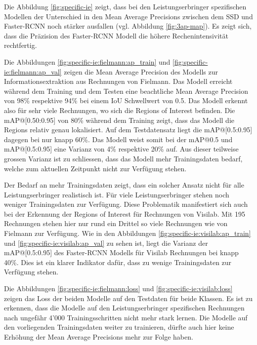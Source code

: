 Die Abbildung \ref{fig:specific-ie} zeigt, dass bei den Leistungserbringer spezifischen Modellen der Unterschied in den Mean Average Precisions zwischen dem SSD und Faster-RCNN noch stärker ausfallen (vgl. Abbildung \ref{fig:3ap-map}). Es zeigt sich, dass die Präzision des Faster-RCNN Modell die höhere Rechenintensivität rechtfertig.

Die Abbildungen \ref{fig:specific-ie:fielmann:ap_train} und \ref{fig:specific-ie:fielmann:ap_val} zeigen die Mean Average Precision des Modells zur Informationsextraktion aus Rechnungen von Fielmann. Das Modell erreicht während dem Training und dem Testen eine beachtliche Mean Average Precision von 98\% respektive 94\% bei einem IoU Schwellwert von 0.5. Das Modell erkennt also für sehr viele Rechnungen, wo sich die Regions of Interest befinden. Die mAP@[0.50:0.95] von 80\% während dem Training zeigt, dass das Modell die Regions relativ genau lokalisiert. Auf dem Testdatensatz liegt die mAP@[0.5:0.95] dagegen bei nur knapp 60\%. Das Modell weist somit bei der mAP@0.5 und mAP@[0.5:0.95] eine Varianz von 4\% respektive 20\% auf. Aus dieser teilweise grossen Varianz ist zu schliessen, dass das Modell mehr Trainingsdaten bedarf, welche zum aktuellen Zeitpunkt nicht zur Verfügung stehen.

Der Bedarf an mehr Trainingsdaten zeigt, dass ein solcher Ansatz nicht für alle Leistungserbringer realistisch ist. Für viele Leistungserbringer stehen noch weniger Trainingsdaten zur Verfügung. Diese Problematik manifestiert sich auch bei der Erkennung der Regions of Interest für Rechnungen von Visilab. Mit 195 Rechnungen stehen hier nur rund ein Drittel so viele Rechnungen wie von Fielmann zur Verfügung. Wie in den Abbildungen \ref{fig:specific-ie:visilab:ap_train} und \ref{fig:specific-ie:visilab:ap_val} zu sehen ist, liegt die Varianz der mAP@[0.5:0.95] des Faster-RCNN Modells für Visilab Rechnungen bei knapp 40\%. Dies ist ein klarer Indikator dafür, dass zu wenige Trainingsdaten zur Verfügung stehen.

Die Abbildungen \ref{fig:specific-ie:fielmann:loss} und \ref{fig:specific-ie:visilab:loss} zeigen das Loss der beiden Modelle auf den Testdaten für beide Klassen. Es ist zu erkennen, dass die Modelle auf den Leistungserbringer spezifischen Rechnungen nach ungefähr 4'000 Trainingsschritten nicht mehr stark lernen. Die Modelle auf den vorliegenden Trainingsdaten weiter zu trainieren, dürfte auch hier keine Erhöhung der Mean Average Precisions mehr zur Folge haben.

